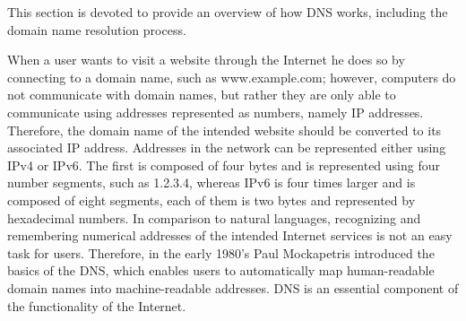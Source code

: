 \label{sec:Preliminaries}
This section is devoted to provide an overview of how DNS works, including the domain name resolution process.

When a user wants to visit a website through the Internet he does so by connecting to a domain name, such as www.example.com; however, computers do not communicate with domain names, but rather they are only able to communicate using addresses represented as numbers, namely IP addresses. Therefore, the domain name of the intended website should be converted to its associated IP address. Addresses in the network can be represented either using IPv4 or IPv6. The first is composed of four bytes and is represented using four number segments, such as 1.2.3.4, whereas IPv6 is four times larger and is composed of eight segments, each of them is two bytes and represented by hexadecimal numbers.  In comparison to natural languages, recognizing and remembering numerical addresses of the intended Internet services is not an easy task for users. Therefore, in the early 1980's Paul Mockapetris  introduced the basics of the DNS, which enables users to automatically map human-readable domain names into machine-readable addresses. DNS is an essential component of the functionality of the Internet.

